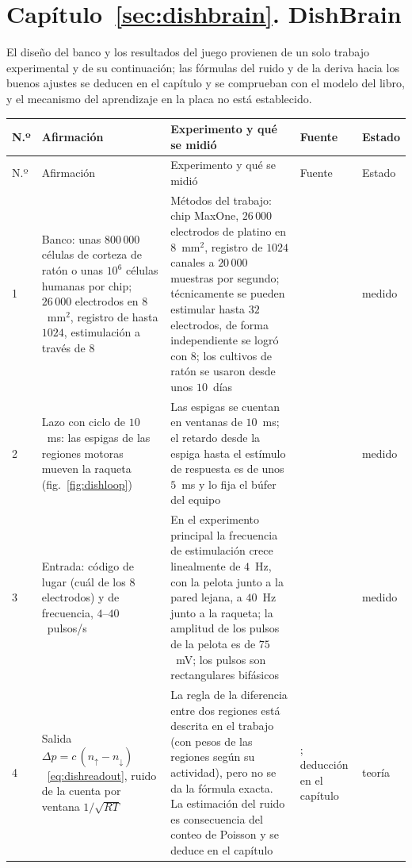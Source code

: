 \section{Capítulo~\ref{sec:dishbrain}. DishBrain}

El diseño del banco y los resultados del juego provienen de un solo trabajo experimental y de su continuación; las fórmulas del ruido y de la deriva hacia los buenos ajustes se deducen en el capítulo y se comprueban con el modelo del libro, y el mecanismo del aprendizaje en la placa no está establecido.

{\footnotesize
\setlength{\tabcolsep}{3pt}\renewcommand{\arraystretch}{1.15}
\begin{longtable}{>{\raggedright}p{0.5cm}>{\raggedright}p{4.0cm}>{\raggedright}p{5.6cm}>{\raggedright}p{2.3cm}>{\raggedright\arraybackslash}p{1.7cm}}
\toprule
N.º & Afirmación & Experimento y qué se midió & Fuente & Estado \\
\midrule\endfirsthead
\toprule
N.º & Afirmación & Experimento y qué se midió & Fuente & Estado \\
\midrule\endhead
1 & Banco: unas $800\,000$ células de corteza de ratón o unas $10^6$ células humanas por chip; $26\,000$ electrodos en $8$~mm$^2$, registro de hasta $1024$, estimulación a través de $8$ & Métodos del trabajo: chip MaxOne, $26\,000$ electrodos de platino en $8$~mm$^2$, registro de $1024$ canales a $20\,000$ muestras por segundo; técnicamente se pueden estimular hasta $32$ electrodos, de forma independiente se logró con $8$; los cultivos de ratón se usaron desde unos $10$~días & \cite{Kagan2022} & medido \\
2 & Lazo con ciclo de $10$~ms: las espigas de las regiones motoras mueven la raqueta (fig.~\ref{fig:dishloop}) & Las espigas se cuentan en ventanas de $10$~ms; el retardo desde la espiga hasta el estímulo de respuesta es de unos $5$~ms y lo fija el búfer del equipo & \cite{Kagan2022} & medido \\
3 & Entrada: código de lugar (cuál de los $8$ electrodos) y de frecuencia, $4$--$40$~pulsos/s & En el experimento principal la frecuencia de estimulación crece linealmente de $4$~Hz, con la pelota junto a la pared lejana, a $40$~Hz junto a la raqueta; la amplitud de los pulsos de la pelota es de $75$~mV; los pulsos son rectangulares bifásicos & \cite{Kagan2022} & medido \\
4 & Salida $\Delta p=c\,(n_\uparrow-n_\downarrow)$~\eqref{eq:dishreadout}, ruido de la cuenta por ventana $1/\sqrt{RT}$ & La regla de la diferencia entre dos regiones está descrita en el trabajo (con pesos de las regiones según su actividad), pero no se da la fórmula exacta. La estimación del ruido es consecuencia del conteo de Poisson y se deduce en el capítulo & \cite{Kagan2022}; deducción en el capítulo & teoría \\

\end{longtable}}

